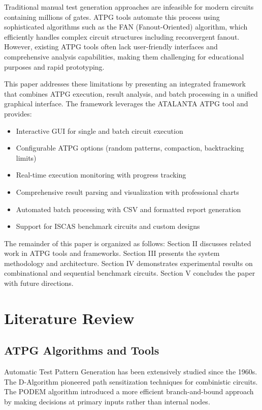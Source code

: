 \documentclass[conference]{IEEEtran}
\begin{document}
Traditional manual test generation approaches are infeasible for modern circuits containing millions of gates. ATPG tools automate this process using sophisticated algorithms such as the FAN (Fanout-Oriented) algorithm, which efficiently handles complex circuit structures including reconvergent fanout. However, existing ATPG tools often lack user-friendly interfaces and comprehensive analysis capabilities, making them challenging for educational purposes and rapid prototyping.

This paper addresses these limitations by presenting an integrated framework that combines ATPG execution, result analysis, and batch processing in a unified graphical interface. The framework leverages the ATALANTA ATPG tool and provides:

\begin{itemize}
\item Interactive GUI for single and batch circuit execution
\item Configurable ATPG options (random patterns, compaction, backtracking limits)
\item Real-time execution monitoring with progress tracking
\item Comprehensive result parsing and visualization with professional charts
\item Automated batch processing with CSV and formatted report generation
\item Support for ISCAS benchmark circuits and custom designs
\end{itemize}

The remainder of this paper is organized as follows: Section II discusses related work in ATPG tools and frameworks. Section III presents the system methodology and architecture. Section IV demonstrates experimental results on combinational and sequential benchmark circuits. Section V concludes the paper with future directions.

\section{Literature Review}

\subsection{ATPG Algorithms and Tools}

Automatic Test Pattern Generation has been extensively studied since the 1960s. The D-Algorithm \cite{b1} pioneered path sensitization techniques for combinistic circuits. The PODEM algorithm \cite{b2} introduced a more efficient branch-and-bound approach by making decisions at primary inputs rather than internal nodes.
\end{document}
